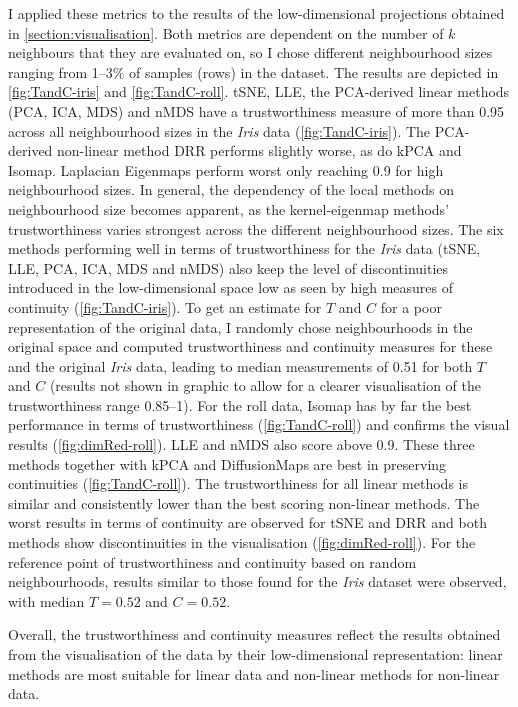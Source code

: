 I applied these metrics to the results of the low-dimensional projections obtained in \cref{section:visualisation}. Both metrics are dependent on the number of \(k\) neighbours that they are evaluated on, so I chose different neighbourhood sizes ranging from \numrange{1}{3}\% of samples (rows) in the dataset. The results are depicted in \cref{fig:TandC-iris} and \cref{fig:TandC-roll}. tSNE, LLE, the PCA-derived linear methods (PCA, ICA, MDS) and nMDS have a trustworthiness measure of more than \num{0.95} across all neighbourhood sizes in the \textit{Iris} data (\cref{fig:TandC-iris}). The PCA-derived non-linear method DRR performs slightly worse, as do kPCA and Isomap. Laplacian Eigenmaps perform worst only reaching \num{0.9} for high neighbourhood sizes. In general, the dependency of the local methods on neighbourhood size becomes apparent, as the kernel-eigenmap methods' trustworthiness varies strongest across the different neighbourhood sizes. The six methods performing well in terms of trustworthiness for the \textit{Iris} data (tSNE, LLE, PCA, ICA, MDS and nMDS) also keep the level of discontinuities introduced in the low-dimensional space low as seen by high measures of continuity (\cref{fig:TandC-iris}). To get an estimate for \(T\) and \(C\) for a poor representation of the original data, I randomly chose neighbourhoods in the original space and computed trustworthiness and continuity measures for these and the original \textit{Iris} data, leading to median measurements of \num{0.51} for both \(T\) and \(C\) (results not shown in graphic to allow for a clearer visualisation of the trustworthiness range \numrange{0.85}{1}).  For the roll data, Isomap has by far the best performance in terms of trustworthiness (\cref{fig:TandC-roll}) and confirms the visual results (\cref{fig:dimRed-roll}). LLE and nMDS also score above \num{0.9}. These three methods together with kPCA and DiffusionMaps are best in preserving continuities (\cref{fig:TandC-roll}). The trustworthiness for all linear methods is similar and consistently lower than the best scoring non-linear methods. The worst results in terms of continuity are observed for tSNE and DRR and both methods show discontinuities in the visualisation (\cref{fig:dimRed-roll}).  For the reference point of trustworthiness and continuity based on random neighbourhoods, results similar to those found for the \textit{Iris} dataset were observed, with median \(T=0.52\) and \(C=0.52\).

Overall, the trustworthiness and continuity measures reflect the results obtained from the visualisation of the data by their low-dimensional representation: linear methods are most suitable for linear data and non-linear methods for non-linear data. 

